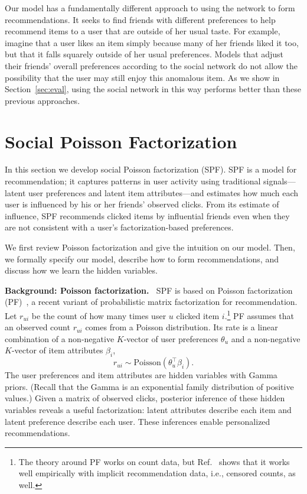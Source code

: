 \documentclass{sig-alternate-2013}
\newcommand{\mypar}[1]{\vspace{0.05in} \noindent \textbf{#1 \,}}
\begin{document}
Our model has a fundamentally different approach to using the network
to form recommendations.  It seeks to find friends with different
preferences to help recommend items to a user that are outside of her
usual taste.  For example, imagine that a user likes an item simply
because many of her friends liked it too, but that it falls squarely
outside of her usual preferences.  Models that adjust their friends'
overall preferences according to the social network do not allow the
possibility that the user may still enjoy this anomalous item. As we
show in Section~\ref{sec:eval}, using the social network in this way
performs better than these previous approaches.


\section{Social Poisson Factorization}
\label{sec:SPF}
In this section we develop social Poisson factorization (SPF).  SPF is
a model for recommendation; it captures patterns in user activity
using traditional signals---latent user preferences and latent item
attributes---and estimates how much each user is influenced by his or
her friends' observed clicks.  From its estimate of influence, SPF
recommends clicked items by influential friends even when they are
not consistent with a user's factorization-based preferences.

We first review Poisson factorization and give the intuition on our model.
Then, we formally specify our model, describe how to form recommendations,
and discuss how we learn the hidden variables.

\mypar{Background: Poisson factorization.}  SPF is based on Poisson
factorization (PF)~\cite{poisMF}, a recent variant of probabilistic
matrix factorization for recommendation.  Let $r_{ui}$ be the count of
how many times user $u$ clicked item $i$.\footnote{The theory around
  PF works on count data, but Ref.~\cite{poisMF} shows that it works
  well empirically with implicit recommendation data, i.e., censored
  counts, as well.}  PF assumes that an observed count $r_{ui}$ comes
from a Poisson distribution.  Its rate is a linear combination of a
non-negative $K$-vector of user preferences $\theta_u$ and a
non-negative $K$-vector of item attributes $\beta_i$,
\begin{equation*}
  r_{ui} \sim \textrm{Poisson}(\theta_u^\top \beta_i).
\end{equation*}
The user preferences and item attributes are hidden variables with
Gamma priors. (Recall that the Gamma is an exponential family
distribution of positive values.)  Given a matrix of observed
clicks, posterior inference of these hidden variables reveals a
useful factorization: latent attributes describe each item and
latent preference describe each user.  These inferences enable
personalized recommendations.
\end{document}
